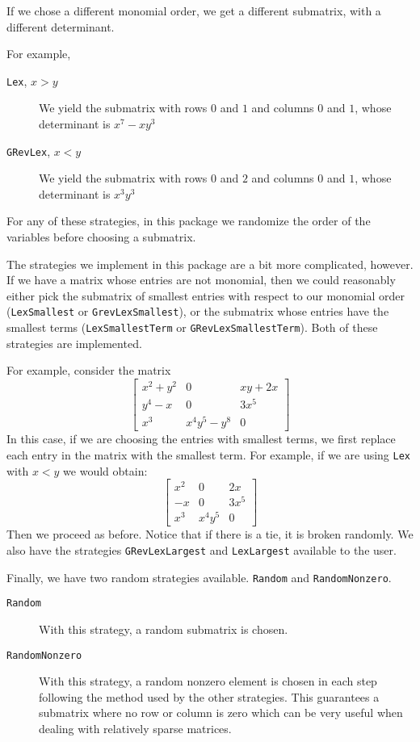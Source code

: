 \documentclass[11pt]{amsart}
\begin{document}
If we chose a different monomial order, we get a different submatrix, with a different determinant.  

For example, 
\begin{description}  
  \item[{\tt Lex}, $x > y$] We yield the submatrix with rows $0$ and $1$ and columns $0$ and $1$, whose determinant is $x^7 - x y^3$
  \item[{\tt GRevLex}, $x < y$] We yield the submatrix with rows $0$ and $2$ and columns $0$ and $1$, whose determinant is $x^3 y^3$
\end{description}
For any of these strategies, in this package we randomize the order of the variables before choosing a submatrix.

The strategies we implement in this package are a bit more complicated, however.  
If we have a matrix whose entries are not monomial, then we could reasonably either pick the 
submatrix of smallest entries with respect to our monomial order ({\tt LexSmallest} or {\tt GrevLexSmallest}), or the submatrix whose 
entries have the smallest terms ({\tt LexSmallestTerm} or {\tt GRevLexSmallestTerm}).  Both of these strategies are implemented.  

For example, consider the matrix
\[
  \left[\begin{array}{ccc}
    x^2 + y^2 & 0 & xy + 2x \\
    y^4 - x & 0 & 3 x^5 \\
    x^3 & x^4 y^5  - y^8 & 0
  \end{array} \right]
\]
In this case, if we are choosing the entries with smallest terms, we first replace each entry in the matrix 
with the smallest term.  For example, if we are using {\tt Lex} with $x < y$ we would obtain:
\[
  \left[\begin{array}{ccc}
    x^2 & 0 & 2x \\
    -x & 0 & 3 x^5 \\
    x^3 & x^4 y^5 & 0
  \end{array} \right]
\]
Then we proceed as before.  Notice that if there is a tie, it is broken randomly.  We also have the strategies {\tt GRevLexLargest} and {\tt LexLargest} available to the user.

Finally, we have two random strategies available.  {\tt Random} and {\tt RandomNonzero}.  
\begin{description}
  \item[{\tt Random}]  With this strategy, a random submatrix is chosen.
  \item[{\tt RandomNonzero}]  With this strategy, a random nonzero element is chosen in each step following the method used by the other strategies. This guarantees a submatrix where no row or column is zero which can be very useful when dealing with relatively sparse matrices.
\end{description}
\end{document}

